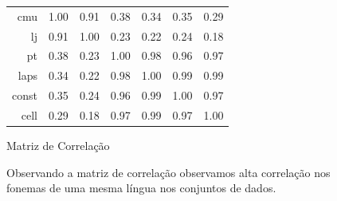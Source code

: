 \begin{figure}
\begin{subtable}{0.5\textwidth}
\begin{tabular}[c]{|r|cccccc|}
        \hline
        cmu   &       1.00 &       0.91 &       0.38 &       0.34 &       0.35 &       0.29 \\
        lj    &       0.91 &       1.00 &       0.23 &       0.22 &       0.24 &       0.18 \\
        pt    &       0.38 &       0.23 &       1.00 &       0.98 &       0.96 &       0.97 \\
        laps  &       0.34 &       0.22 &       0.98 &       1.00 &       0.99 &       0.99 \\
        const &       0.35 &       0.24 &       0.96 &       0.99 &       1.00 &       0.97 \\
        cell  &       0.29 &       0.18 &       0.97 &       0.99 &       0.97 &       1.00 \\
        \hline
        \end{tabular}
        \caption{Matriz de Correlação}
    \end{subtable}
    \caption[Correlação entre Datasets]{Observando a matriz de correlação observamos alta correlação nos fonemas de uma mesma língua nos conjuntos de dados.}
    \label{fig:corr}
\end{figure}

